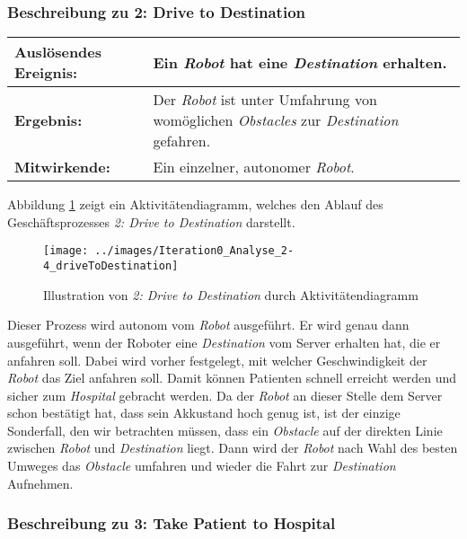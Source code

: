 			\subsubsection*{Beschreibung zu 2: Drive to Destination}

			\begin{table}[H]
				\centering
				\begin{tabularx}{\textwidth}{@{}p{3cm}X@{}}
				\hline
				\textbf{Auslösendes Ereignis:} & Ein \emph{Robot} hat eine \emph{Destination} erhalten.\\ \hline
				\textbf{Ergebnis:} & Der \emph{Robot} ist unter Umfahrung von womöglichen \emph{Obstacles} zur \emph{Destination} gefahren.\\ \hline
				\textbf{Mitwirkende:} &	Ein einzelner, autonomer \emph{Robot}. \\
				\hline
				\end{tabularx}
				\label{tab:2-4-drive-to-destination}
			\end{table}

			Abbildung \ref{fig:2-4-drive-to-destination-aktivitaetendiagramm} zeigt ein Aktivitätendiagramm, welches den Ablauf des Geschäftsprozesses \emph{2: Drive to Destination} darstellt.

			\begin{figure}[H]
				\centering
				\texttt{[image: ../images/Iteration0\_Analyse\_2-4\_driveToDestination]}
				\caption{Illustration von \emph{2: Drive to Destination} durch Aktivitätendiagramm}
				\label{fig:2-4-drive-to-destination-aktivitaetendiagramm}
			\end{figure}

			Dieser Prozess wird autonom vom \emph{Robot} ausgeführt. Er wird genau
			dann ausgeführt, wenn der Roboter eine \emph{Destination} vom Server
			erhalten hat, die er anfahren soll. Dabei wird vorher festgelegt, mit welcher Geschwindigkeit der \emph{Robot} das Ziel anfahren soll. Damit können Patienten schnell erreicht werden und sicher zum \emph{Hospital} gebracht werden. Da der \emph{Robot} an dieser Stelle
			dem Server schon bestätigt hat, dass sein Akkustand hoch genug ist, ist
			der einzige Sonderfall, den wir betrachten müssen, dass ein
			\emph{Obstacle} auf der direkten Linie zwischen \emph{Robot} und
			\emph{Destination} liegt. Dann wird der \emph{Robot} nach Wahl des
			besten Umweges das \emph{Obstacle} umfahren und wieder die Fahrt zur
			\emph{Destination} Aufnehmen.



			\subsubsection*{Beschreibung zu 3: Take Patient to Hospital}


